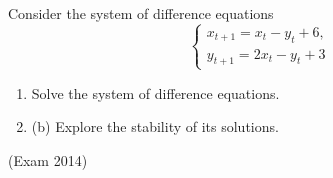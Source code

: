 \begin{solution}
\end{solution}






\begin{problem}
Consider the system of difference equations
\[
\begin{cases}
 x_{t+1} =x_{t} -y_{t} +6, \\ 
 y_{t+1} =2x_{t} -y_{t} +3
\end{cases} 
 \] 

\begin{enumerate}
\item  Solve the system of difference equations.

\item  (b) Explore the stability of its solutions.
\end{enumerate}

(Exam 2014)
\end{problem}

